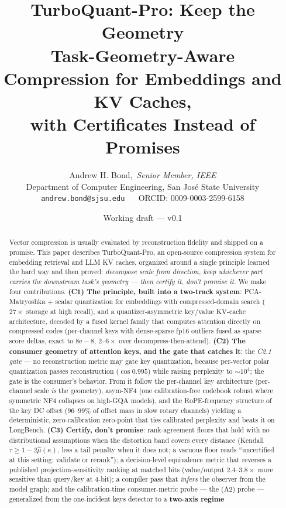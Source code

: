 \documentclass[11pt]{article}
\title{\textbf{TurboQuant-Pro: Keep the Geometry}\\[4pt]
\large Task-Geometry-Aware Compression for Embeddings and KV Caches,\\
with Certificates Instead of Promises}
\author{Andrew H. Bond,~\emph{Senior Member, IEEE}\\
Department of Computer Engineering, San Jos\'e State University\\
\texttt{andrew.bond@sjsu.edu} ~\textbar~ ORCID: 0009-0003-2599-6158}
\date{Working draft --- v0.1}
\begin{document}
\maketitle

\begin{abstract}
Vector compression is usually evaluated by reconstruction fidelity and shipped
on a promise. This paper describes TurboQuant-Pro, an open-source compression
system for embedding retrieval and LLM KV caches, organized around a single
principle learned the hard way and then proved: \emph{decompose scale from
direction, keep whichever part carries the downstream task's geometry --- then
certify it, don't promise it.} We make four contributions.
\textbf{(C1) The principle, built into a two-track system}: PCA-Matryoshka $+$
scalar quantization for embeddings with compressed-domain search
($27\times$ storage at high recall), and a quantizer-asymmetric key/value
KV-cache architecture, decoded by a fused kernel family that computes attention
directly on compressed codes (per-channel keys with dense-sparse fp16 outliers
fused as sparse score deltas, exact to $8\mathrm{e}{-}8$, $2$--$6\times$ over
decompress-then-attend).
\textbf{(C2) The consumer geometry of attention keys, and the gate that catches
it}: the \emph{C2.1 gate} --- no reconstruction metric may gate key quantization,
because per-vector polar quantization passes reconstruction ($\cos 0.995$) while
raising perplexity to ${\sim}10^4$; the gate is the consumer's behavior. From it
follow the per-channel key architecture (per-channel scale \emph{is} the
geometry), asym-NF4 (one calibration-free codebook robust where symmetric NF4
collapses on high-GQA models), and the RoPE-frequency structure of the key DC
offset ($96$--$99\%$ of offset mass in slow rotary channels) yielding a
deterministic, zero-calibration zero-point that ties calibrated perplexity and
beats it on LongBench.
\textbf{(C3) Certify, don't promise}: rank-agreement floors that hold with no distributional assumptions when the
distortion band covers every distance (Kendall $\tau \geq 1-2\hat\mu(\kappa)$,
less a tail penalty when it does not; a vacuous floor reads ``uncertified at
this setting: validate or rerank''); a decision-level equivalence metric that reverses a published
projection-sensitivity ranking at matched bits (value/output $2.4$--$3.8\times$ more
sensitive than query/key at 4-bit); a compiler pass that \emph{infers} the observer from
the model graph; and the calibration-time consumer-metric probe --- the (A2) probe
--- generalized from the one-incident keys detector to a \textbf{two-axis regime
}
\end{abstract}
\end{document}
